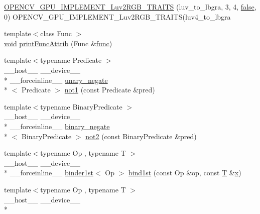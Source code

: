 \begin{DoxyCompactItemize}
\item 
\hyperlink{namespacecv_1_1gpu_1_1device_a38759ab9d72353ec911eb80c97ea68a6}{O\-P\-E\-N\-C\-V\-\_\-\-G\-P\-U\-\_\-\-I\-M\-P\-L\-E\-M\-E\-N\-T\-\_\-\-Luv2\-R\-G\-B\-\_\-\-T\-R\-A\-I\-T\-S} (luv\-\_\-to\-\_\-lbgra, 3, 4, \hyperlink{namespacecv_1_1gpu_1_1device_af8d6418be1712e83b4f398e7e7273026}{false}, 0) O\-P\-E\-N\-C\-V\-\_\-\-G\-P\-U\-\_\-\-I\-M\-P\-L\-E\-M\-E\-N\-T\-\_\-\-Luv2\-R\-G\-B\-\_\-\-T\-R\-A\-I\-T\-S(luv4\-\_\-to\-\_\-lbgra
\item 
{\footnotesize template$<$class Func $>$ }\\\hyperlink{legacy_8hpp_a8bb47f092d473522721002c86c13b94e}{void} \hyperlink{namespacecv_1_1gpu_1_1device_a4e0b378654c16a922d6916469301bff5}{print\-Func\-Attrib} (Func \&\hyperlink{core__c_8h_a120677ac732b3c9bfecab149fc978afa}{func})
\item 
{\footnotesize template$<$typename Predicate $>$ }\\\-\_\-\-\_\-host\-\_\-\-\_\- \-\_\-\-\_\-device\-\_\-\-\_\- \\*
\-\_\-\-\_\-forceinline\-\_\-\-\_\- \hyperlink{structcv_1_1gpu_1_1device_1_1unary__negate}{unary\-\_\-negate}\\*
$<$ Predicate $>$ \hyperlink{namespacecv_1_1gpu_1_1device_a2d8c098dbada6f3d9075f7fb54bad9fe}{not1} (const Predicate \&pred)
\item 
{\footnotesize template$<$typename Binary\-Predicate $>$ }\\\-\_\-\-\_\-host\-\_\-\-\_\- \-\_\-\-\_\-device\-\_\-\-\_\- \\*
\-\_\-\-\_\-forceinline\-\_\-\-\_\- \hyperlink{structcv_1_1gpu_1_1device_1_1binary__negate}{binary\-\_\-negate}\\*
$<$ Binary\-Predicate $>$ \hyperlink{namespacecv_1_1gpu_1_1device_a31bab8fbe2d9bde01bcf65f53d7574af}{not2} (const Binary\-Predicate \&pred)
\item 
{\footnotesize template$<$typename Op , typename T $>$ }\\\-\_\-\-\_\-host\-\_\-\-\_\- \-\_\-\-\_\-device\-\_\-\-\_\- \\*
\-\_\-\-\_\-forceinline\-\_\-\-\_\- \hyperlink{structcv_1_1gpu_1_1device_1_1binder1st}{binder1st}$<$ Op $>$ \hyperlink{namespacecv_1_1gpu_1_1device_a32240aee5e695e15ead8d6568013d4ef}{bind1st} (const Op \&op, const \hyperlink{calib3d_8hpp_a3efb9551a871ddd0463079a808916717}{T} \&\hyperlink{highgui__c_8h_a6150e0515f7202e2fb518f7206ed97dc}{x})
\item 
{\footnotesize template$<$typename Op , typename T $>$ }\\\-\_\-\-\_\-host\-\_\-\-\_\- \-\_\-\-\_\-device\-\_\-\-\_\- \\*

\end{DoxyCompactItemize}
